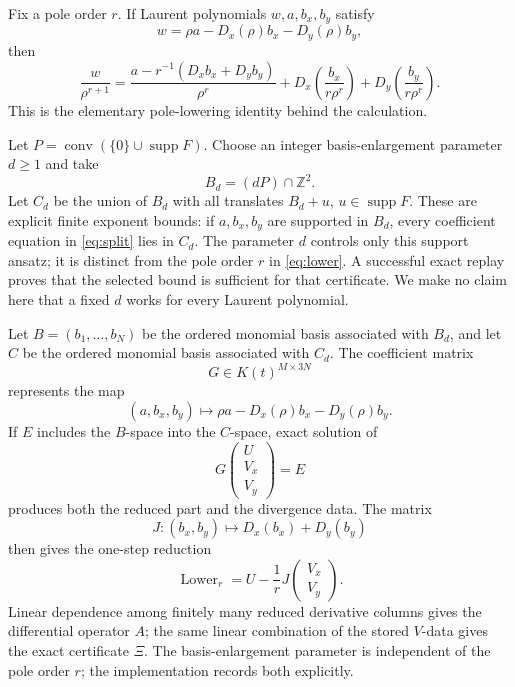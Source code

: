 \documentclass[11pt,fleqn]{article}
\theoremstyle{plain}
\newcommand{\Dx}{D_x}
\newcommand{\Dy}{D_y}
\begin{document}
Fix a pole order \(r\).  If Laurent polynomials \(w,a,b_x,b_y\) satisfy
\begin{equation}\label{eq:split}
 w=\rho a-\Dx(\rho)b_x-\Dy(\rho)b_y,
\end{equation}
then
\begin{equation}\label{eq:lower}
 \frac{w}{\rho^{r+1}}
 =\frac{a-r^{-1}(\Dx b_x+\Dy b_y)}{\rho^r}
 +\Dx\!\left(\frac{b_x}{r\rho^r}\right)
 +\Dy\!\left(\frac{b_y}{r\rho^r}\right).
\end{equation}
This is the elementary pole-lowering identity behind the calculation.

Let \(P=\operatorname{conv}(\{0\}\cup\operatorname{supp}F)\).  Choose an
integer basis-enlargement parameter \(d\ge1\) and take
\[
 B_d=(dP)\cap\mathbb Z^2.
\]
Let \(C_d\) be the union of \(B_d\) with all translates
\(B_d+u\), \(u\in\operatorname{supp}F\).  These are explicit finite exponent
bounds: if \(a,b_x,b_y\) are supported in \(B_d\), every coefficient equation
in \eqref{eq:split} lies in \(C_d\).  The parameter \(d\) controls only this
support ansatz; it is distinct from the pole order \(r\) in
\eqref{eq:lower}.  A successful exact replay proves that the selected bound is
sufficient for that certificate.  We make no claim here that a fixed \(d\)
works for every Laurent polynomial.

Let \(B=(b_1,\ldots,b_N)\) be the ordered monomial basis associated with
\(B_d\), and let \(C\) be the ordered monomial basis associated with \(C_d\).
The coefficient matrix
\[
 G\in K(t)^{M\times3N}
\]
represents the map
\[
 (a,b_x,b_y)\longmapsto
 \rho a-\Dx(\rho)b_x-\Dy(\rho)b_y.
\]
If \(E\) includes the \(B\)-space into the \(C\)-space, exact solution of
\begin{equation}\label{eq:GUV}
 G\begin{pmatrix}U\\V_x\\V_y\end{pmatrix}=E
\end{equation}
produces both the reduced part and the divergence data.  The matrix
\[
 J: (b_x,b_y)\longmapsto \Dx(b_x)+\Dy(b_y)
\]
then gives the one-step reduction
\begin{equation}\label{eq:lower-matrix}
 \operatorname{Lower}_r=U-\frac1rJ
 \begin{pmatrix}V_x\\V_y\end{pmatrix}.
\end{equation}
Linear dependence among finitely many reduced derivative columns gives the
differential operator \(A\); the same linear combination of the stored \(V\)-data gives
the exact certificate \(\Xi\).  The basis-enlargement parameter is independent
of the pole order \(r\); the implementation records both explicitly.
\end{document}
